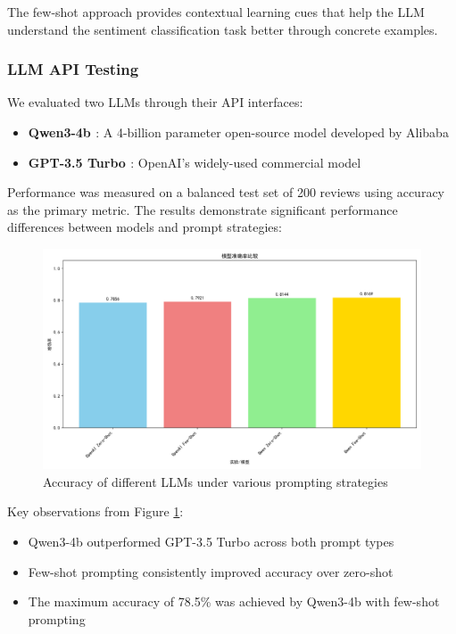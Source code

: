 \documentclass{article}
\begin{document}
The few-shot approach provides contextual learning cues that help the LLM understand the sentiment classification task better through concrete examples.

\subsubsection{LLM API Testing}
\label{sssec:llm_api}

We evaluated two LLMs through their API interfaces:
\begin{itemize}
    \item \textbf{Qwen3-4b \cite{yang2025qwen3technicalreport}}: A 4-billion parameter open-source model developed by Alibaba
    \item \textbf{GPT-3.5 Turbo \cite{OpenAI2023}}: OpenAI's widely-used commercial model
\end{itemize}

Performance was measured on a balanced test set of 200 reviews using accuracy as the primary metric. The results demonstrate significant performance differences between models and prompt strategies:

\begin{figure}[h]
    \centering
    \includegraphics[width=1\columnwidth]{pic/T2P2.c.acc.png}
    \caption{Accuracy of different LLMs under various prompting strategies}
    \label{fig:llm_accuracy}
\end{figure}

Key observations from Figure \ref{fig:llm_accuracy}:
\begin{itemize}
    \item Qwen3-4b outperformed GPT-3.5 Turbo across both prompt types
    \item Few-shot prompting consistently improved accuracy over zero-shot
    \item The maximum accuracy of 78.5\% was achieved by Qwen3-4b with few-shot prompting
\end{itemize}
\end{document}
